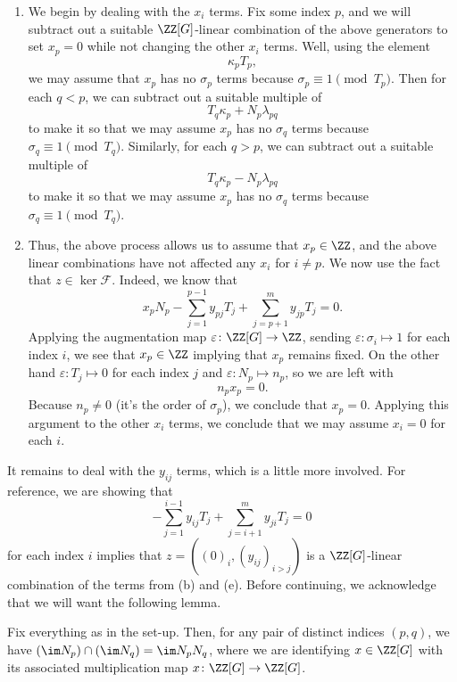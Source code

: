 \documentclass{article}
\numberwithin{equation}{section}
\begin{document}
\begin{enumerate}
	\item We begin by dealing with the $x_i$ terms. Fix some index $p$, and we will subtract out a suitable $\ZZ[G]$-linear combination of the above generators to set $x_p=0$ while not changing the other $x_i$ terms. Well, using the element
	\[\kappa_pT_p,\tag{a}\]
	we may assume that $x_p$ has no $\sigma_p$ terms because $\sigma_p\equiv1\pmod{T_p}$. Then for each $q<p$, we can subtract out a suitable multiple of
	\[T_q\kappa_p+N_p\lambda_{pq}\tag{c}\]
	to make it so that we may assume $x_p$ has no $\sigma_q$ terms because $\sigma_q\equiv1\pmod{T_q}$. Similarly, for each $q>p$, we can subtract out a suitable multiple of
	\[T_q\kappa_p-N_p\lambda_{pq}\tag{d}\]
	to make it so that we may assume $x_p$ has no $\sigma_q$ terms because $\sigma_q\equiv1\pmod{T_q}$.

	\item Thus, the above process allows us to assume that $x_p\in\ZZ$, and the above linear combinations have not affected any $x_i$ for $i\ne p$. We now use the fact that $z\in\ker\mathcal F$. Indeed, we know that
	\[x_pN_p-\sum_{j=1}^{p-1}y_{pj}T_j+\sum_{j=p+1}^my_{jp}T_j=0.\]
	Applying the augmentation map $\varepsilon\colon\ZZ[G]\to\ZZ$, sending $\varepsilon\colon\sigma_i\mapsto1$ for each index $i$, we see that $x_p\in\ZZ$ implying that $x_p$ remains fixed. On the other hand $\varepsilon\colon T_j\mapsto0$ for each index $j$ and $\varepsilon\colon N_p\mapsto n_p$, so we are left with
	\[n_px_p=0.\]
	Because $n_p\ne0$ (it's the order of $\sigma_p$), we conclude that $x_p=0$. Applying this argument to the other $x_i$ terms, we conclude that we may assume $x_i=0$ for each $i$.
\end{enumerate}
It remains to deal with the $y_{ij}$ terms, which is a little more involved. For reference, we are showing that
\[-\sum_{j=1}^{i-1}y_{ij}T_j+\sum_{j=i+1}^my_{ji}T_j=0\]
for each index $i$ implies that $z=((0)_i,(y_{ij})_{i>j})$ is a $\ZZ[G]$-linear combination of the terms from (b) and (e). Before continuing, we acknowledge that we will want the following lemma.
\begin{lemma} \label{lem:separatenijs}
	Fix everything as in the set-up. Then, for any pair of distinct indices $(p,q)$, we have $(\im N_p)\cap(\im N_q)=\im N_pN_q$, where we are identifying $x\in\ZZ[G]$ with its associated multiplication map $x\colon\ZZ[G]\to\ZZ[G]$.
\end{lemma}
\end{document}
